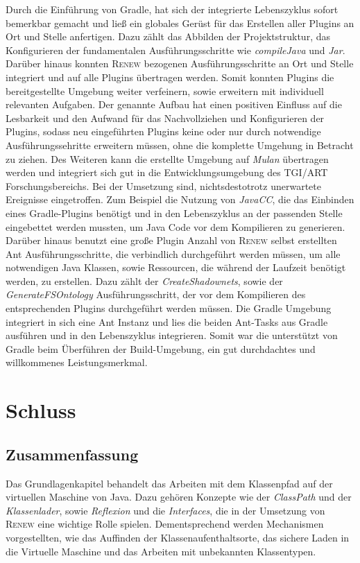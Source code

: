 Durch die Einführung von Gradle, hat sich der integrierte Lebenszyklus sofort bemerkbar gemacht und ließ ein globales Gerüst für das Erstellen aller Plugins an Ort und Stelle anfertigen. Dazu zählt das Abbilden der Projektstruktur, das Konfigurieren der fundamentalen Ausführungsschritte wie \textit{compileJava} und \textit{Jar}. Darüber hinaus konnten \textsc{Renew} bezogenen Ausführungsschritte an Ort und Stelle integriert und auf alle Plugins übertragen werden. Somit konnten Plugins die bereitgestellte Umgebung weiter verfeinern, sowie erweitern mit individuell  relevanten Aufgaben. Der genannte Aufbau hat einen positiven Einfluss auf die Lesbarkeit und den Aufwand für das Nachvollziehen und Konfigurieren der Plugins, sodass neu eingeführten Plugins keine oder nur durch notwendige Ausführungssehritte erweitern müssen, ohne die komplette Umgehung in Betracht zu ziehen. Des Weiteren kann die erstellte Umgebung auf \textit{Mulan} übertragen werden und integriert sich gut in die Entwicklungsumgebung des TGI/ART Forschungsbereichs.\newline
Bei der Umsetzung sind, nichtsdestotrotz unerwartete Ereignisse eingetroffen. Zum Beispiel die Nutzung von \textit{JavaCC}, die das Einbinden eines Gradle-Plugins benötigt und in den Lebenszyklus an der passenden Stelle eingebettet werden mussten, um Java Code vor dem Kompilieren zu generieren. Darüber hinaus benutzt eine große Plugin Anzahl von \textsc{Renew} selbst erstellten Ant Ausführungsschritte, die verbindlich durchgeführt werden müssen, um alle notwendigen Java Klassen, sowie Ressourcen, die während der Laufzeit benötigt werden, zu erstellen. Dazu zählt der \textit{CreateShadownets}, sowie der \textit{GenerateFSOntology} Ausführungsschritt, der vor dem Kompilieren des entsprechenden Plugins durchgeführt werden müssen. Die Gradle Umgebung integriert in sich eine Ant Instanz und lies die beiden Ant-Tasks aus Gradle ausführen und in den Lebenszyklus integrieren. Somit war die unterstützt von Gradle beim Überführen der Build-Umgebung, ein gut durchdachtes und willkommenes Leistungsmerkmal.

\chapter{Schluss}

\section{Zusammenfassung}

Das Grundlagenkapitel behandelt das Arbeiten mit dem Klassenpfad auf der virtuellen Maschine von Java. Dazu gehören Konzepte wie der \textit{ClassPath} und der \textit{Klassenlader}, sowie \textit{Reflexion} und die \textit{Interfaces}, die in der Umsetzung von \textsc{Renew} eine wichtige Rolle spielen. Dementsprechend werden Mechanismen vorgestellten, wie das Auffinden der Klassenaufenthaltsorte, das sichere Laden in die Virtuelle Maschine und das Arbeiten mit unbekannten Klassentypen.\bigbreak

